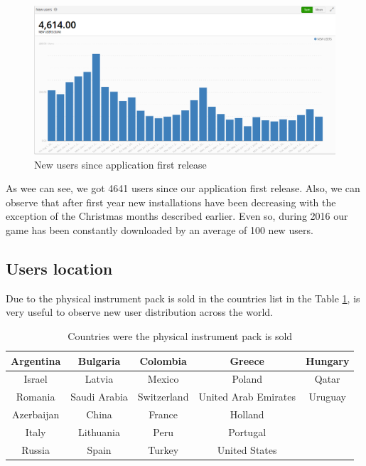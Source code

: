 \begin{figure}[h]
\centering
\includegraphics[width=350pt]{graphics/evaluation/bars_users_all.png}
\caption{New users since application first release}
\label{fig:bars-all-year}
\end{figure}

\FloatBarrier

As wee can see, we got 4641 users since our application first release. Also, we can observe that after first year new installations have been decreasing with the exception of the Christmas months described earlier. Even so, during 2016 our game has been constantly downloaded by an average of 100 new users.

\subsection{Users location}

Due to the physical instrument pack is sold in the countries list in the Table \ref{tab:countries}, is very useful to observe new user distribution across the world.

\begin{table}[!htpb]
\centering
    \begin{tabular}{|c|c|c|c|c|}
	\hline
	Argentina & Bulgaria & Colombia & Greece & Hungary \\
	\hline
	Israel & Latvia & Mexico & Poland & Qatar \\
	\hline
	Romania & Saudi Arabia & Switzerland & United Arab Emirates & Uruguay \\
	\hline
	Azerbaijan & China & France & Holland & ~\\
	\hline
	Italy & Lithuania & Peru & Portugal & ~\\
	\hline
	Russia & Spain & Turkey & United States & ~\\
    \hline
    \end{tabular}
\caption{Countries were the physical instrument pack is sold}
\label{tab:countries}
\end{table}

